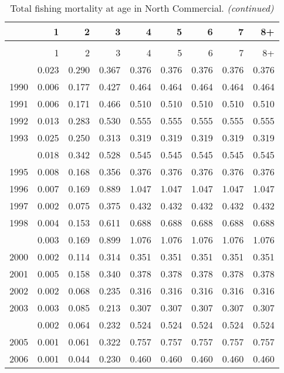 \documentclass[
]{article}
\begin{document}
\begin{longtable}[t]{lrrrrrrrr}
\caption{\label{tab:North_Commercial-fleet-FAA-table}Total fishing mortality at age in North Commercial.}\\
\toprule
  & 1 & 2 & 3 & 4 & 5 & 6 & 7 & 8+\\
\midrule
\endfirsthead
\caption[]{Total fishing mortality at age in North Commercial. \textit{(continued)}}\\
\toprule
  & 1 & 2 & 3 & 4 & 5 & 6 & 7 & 8+\\
\midrule
\endhead

\endfoot
\bottomrule
\endlastfoot
1989 & 0.023 & 0.290 & 0.367 & 0.376 & 0.376 & 0.376 & 0.376 & 0.376\\
1990 & 0.006 & 0.177 & 0.427 & 0.464 & 0.464 & 0.464 & 0.464 & 0.464\\
1991 & 0.006 & 0.171 & 0.466 & 0.510 & 0.510 & 0.510 & 0.510 & 0.510\\
1992 & 0.013 & 0.283 & 0.530 & 0.555 & 0.555 & 0.555 & 0.555 & 0.555\\
1993 & 0.025 & 0.250 & 0.313 & 0.319 & 0.319 & 0.319 & 0.319 & 0.319\\
\addlinespace
1994 & 0.018 & 0.342 & 0.528 & 0.545 & 0.545 & 0.545 & 0.545 & 0.545\\
1995 & 0.008 & 0.168 & 0.356 & 0.376 & 0.376 & 0.376 & 0.376 & 0.376\\
1996 & 0.007 & 0.169 & 0.889 & 1.047 & 1.047 & 1.047 & 1.047 & 1.047\\
1997 & 0.002 & 0.075 & 0.375 & 0.432 & 0.432 & 0.432 & 0.432 & 0.432\\
1998 & 0.004 & 0.153 & 0.611 & 0.688 & 0.688 & 0.688 & 0.688 & 0.688\\
\addlinespace
1999 & 0.003 & 0.169 & 0.899 & 1.076 & 1.076 & 1.076 & 1.076 & 1.076\\
2000 & 0.002 & 0.114 & 0.314 & 0.351 & 0.351 & 0.351 & 0.351 & 0.351\\
2001 & 0.005 & 0.158 & 0.340 & 0.378 & 0.378 & 0.378 & 0.378 & 0.378\\
2002 & 0.002 & 0.068 & 0.235 & 0.316 & 0.316 & 0.316 & 0.316 & 0.316\\
2003 & 0.003 & 0.085 & 0.213 & 0.307 & 0.307 & 0.307 & 0.307 & 0.307\\
\addlinespace
2004 & 0.002 & 0.064 & 0.232 & 0.524 & 0.524 & 0.524 & 0.524 & 0.524\\
2005 & 0.001 & 0.061 & 0.322 & 0.757 & 0.757 & 0.757 & 0.757 & 0.757\\
2006 & 0.001 & 0.044 & 0.230 & 0.460 & 0.460 & 0.460 & 0.460 & 0.460\\

\end{longtable}
\end{document}
